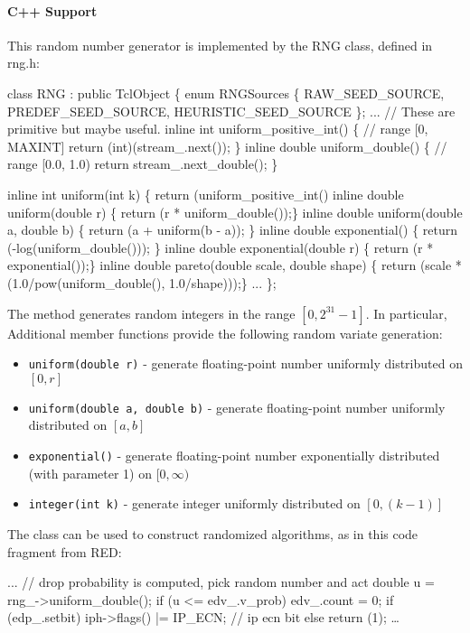 \paragraph{C++ Support}
This random number generator is
implemented by the RNG class, defined in rng.h:
\begin{program}
class RNG : public TclObject \{
enum RNGSources \{ RAW_SEED_SOURCE, PREDEF_SEED_SOURCE, HEURISTIC_SEED_SOURCE \};
        ...
        // These are primitive but maybe useful.
        inline int uniform_positive_int() \{  // range [0, MAXINT]
                return (int)(stream_.next());
        \}
        inline double uniform_double() \{ // range [0.0, 1.0)
                return stream_.next_double();
        \}

        inline int uniform(int k)
                \{ return (uniform_positive_int() %
        inline double uniform(double r) 
                \{ return (r * uniform_double());\}
        inline double uniform(double a, double b)
                \{ return (a + uniform(b - a)); \}
        inline double exponential()
                \{ return (-log(uniform_double())); \}
        inline double exponential(double r)
                \{ return (r * exponential());\}
        inline double pareto(double scale, double shape)
                \{ return (scale * (1.0/pow(uniform_double(), 1.0/shape)));\}
        ...
\};
\end{program}

The  method generates random integers in the
range $[0,2^{31}-1]$.
In particular,
Additional member functions provide the following random variate
generation:
\begin{itemize}
        \item {\tt uniform(double r)} - generate floating-point number uniformly distributed on $[0,r]$
        \item {\tt uniform(double a, double b)} - generate floating-point number uniformly distributed on $[a,b]$
        \item {\tt exponential()} - generate floating-point number exponentially distributed (with parameter 1) on $[0, \infty)$
        \item {\tt integer(int k)} - generate integer uniformly distributed on $[0, (k-1)]$
\end{itemize}
The  class can be used to construct randomized algorithms,
as in this code fragment from RED:
\begin{program}
        ...
        // drop probability is computed, pick random number and act
        double u = rng_->uniform_double();
        if (u <= edv_.v_prob) {
                edv_.count = 0;
                if (edp_.setbit) 
                        iph->flags() |= IP_ECN; // ip ecn bit
                else
                        return (1);
        }
        \ldots
\end{program}
      

